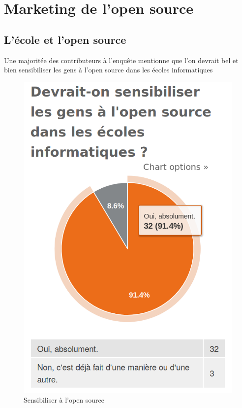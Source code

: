	\newpage

	\section{Marketing de l'open source}

		\subsection{L'école et l'open source}

			Une majoritée des contributeurs à l'enquête mentionne que l'on devrait bel et bien sensibiliser les gens à l'open source dans les écoles informatiques

			\begin{figure}[h]
				\center
				\includegraphics[scale=0.28]{./img/a6}
				\caption{Sensibiliser à l'open source}
			\end{figure}

